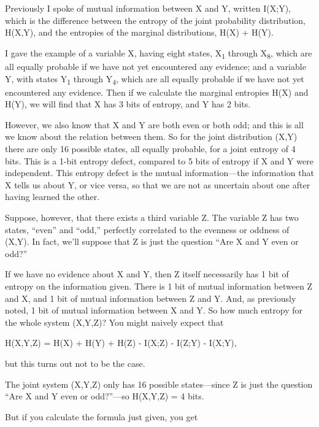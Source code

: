 {
 Previously I spoke of mutual information between X and Y, written
I(X;Y), which is the difference between the entropy of the joint
probability distribution, H(X,Y), and the entropies of the marginal
distributions, H(X) + H(Y). }

{
 I gave the example of a variable X, having eight states,
X\textsubscript{1} through X\textsubscript{8}, which are all equally
probable if we have not yet encountered any evidence; and a variable Y,
with states Y\textsubscript{1} through Y\textsubscript{4}, which are
all equally probable if we have not yet encountered any evidence. Then
if we calculate the marginal entropies H(X) and H(Y), we will find that
X has 3 bits of entropy, and Y has 2 bits.}

{
 However, we also know that X and Y are both even or both odd; and
this is all we know about the relation between them. So for the joint
distribution (X,Y) there are only 16 possible states, all equally
probable, for a joint entropy of 4 bits. This is a 1-bit entropy
defect, compared to 5 bits of entropy if X and Y were independent. This
entropy defect is the mutual information---the information that X tells
us about Y, or vice versa, so that we are not as uncertain about one
after having learned the other.}

{
 Suppose, however, that there exists a third variable Z. The
variable Z has two states, ``even''
and ``odd,'' perfectly correlated to
the evenness or oddness of (X,Y). In fact, we'll
suppose that Z is just the question ``Are X and Y even
or odd?''}

{
 If we have no evidence about X and Y, then Z itself necessarily
has 1 bit of entropy on the information given. There is 1 bit of mutual
information between Z and X, and 1 bit of mutual information between Z
and Y. And, as previously noted, 1 bit of mutual information between X
and Y. So how much entropy for the whole system (X,Y,Z)? You might
naively expect that}

{\centering
 H(X,Y,Z) = H(X) + H(Y) + H(Z) - I(X;Z) - I(Z;Y) - I(X;Y),
\par}


\bigskip

{
 but this turns out not to be the case. }

{
 The joint system (X,Y,Z) only has 16 possible states---since Z is
just the question ``Are X and Y even or
odd?''---so H(X,Y,Z) = 4 bits.}

{
 But if you calculate the formula just given, you get}

